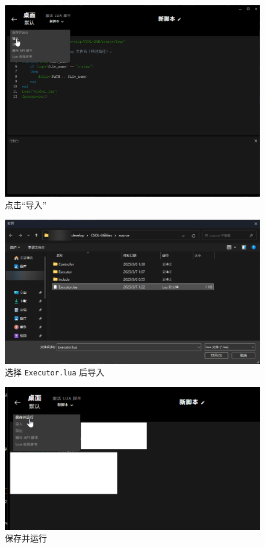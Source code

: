 \begin{figure}[H]
    \Centering
    \includegraphics[width=\textwidth]{assets/intro/import.png}
    \caption{点击“导入”}
    \label{ch0fig-import}
\end{figure}

\begin{figure}[H]
    \Centering
    \includegraphics[width=\textwidth]{assets/intro/import_executor.png}
    \caption{选择 \lstinline{Executor.lua} 后导入}
    \label{ch0fig-import-executor-lua}
\end{figure}

\begin{figure}[H]
    \Centering
    \includegraphics[width=\textwidth]{assets/intro/save_and_run.png}
    \caption{保存并运行}
    \label{ch0fig-save-and-run}
\end{figure}



